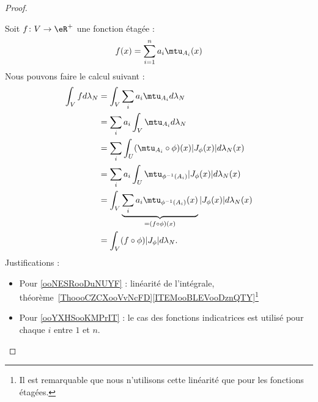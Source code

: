 \begin{proof}
\begin{enumerate}
\begin{subproof}
			      Soit \( f\colon V\to \eR^+\) une fonction étagée :
			      \begin{equation}
				      f(x)=\sum_{i=1}^na_i\mtu_{A_i}(x)
			      \end{equation}
			      Nous pouvons faire le calcul suivant :
			      \begin{subequations}
				      \begin{align}
					      \int_Vfd\lambda_N & =\int_V\sum_ia_i\mtu_{A_i}d\lambda_N                                                                 \\
					                        & =\sum_ia_i\int_{V}\mtu_{A_i}d\lambda_N      \label{ooNESRooDuNUYF}                                   \\
					                        & =\sum_i\int_U(\mtu_{A_i}\circ\phi)(x)| J_{\phi}(x) |d\lambda_N(x)   \label{ooYXHSooKMPrIT}           \\
					                        & =\sum_ia_i\int_U\mtu_{\phi^{-1}(A_i)}| J_{\phi}(x) |d\lambda_N(x)                                    \\
					                        & =\int_V\underbrace{\sum_ia_i\mtu_{\phi^{-1}(A_i)}(x)}_{=(f\circ\phi)(x)}| J_{\phi}(x) |d\lambda_N(x) \\
					                        & =\int_V(f\circ\phi)| J_{\phi} |d\lambda_N.
				      \end{align}
			      \end{subequations}
			      Justifications :
			      \begin{itemize}
				      \item Pour \eqref{ooNESRooDuNUYF} : linéarité de l'intégrale, théorème~\ref{ThoooCZCXooVvNcFD}\ref{ITEMooBLEVooDznQTY}\footnote{Il est remarquable que nous n'utilisons cette linéarité que pour les fonctions étagées.}
				      \item Pour \eqref{ooYXHSooKMPrIT} : le cas des fonctions indicatrices est utilisé pour chaque \( i\) entre \( 1\) et \( n\).
			      \end{itemize}


\end{subproof}
\end{enumerate}
\end{proof}
